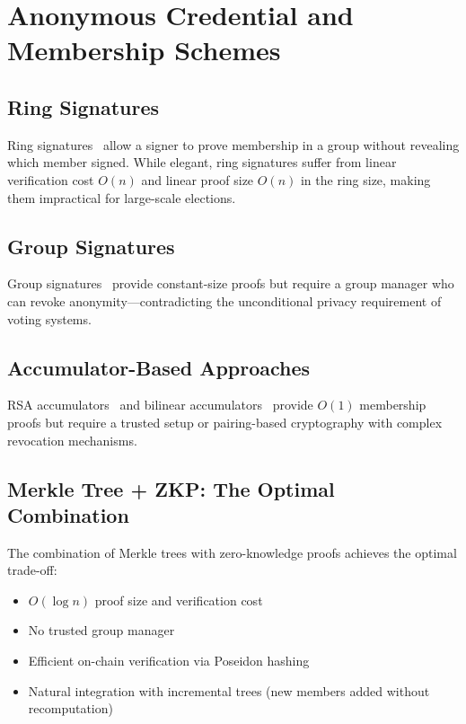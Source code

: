 \section{Anonymous Credential and Membership Schemes}

\subsection{Ring Signatures}

Ring signatures~\cite{rivest2001leak} allow a signer to prove membership in a group without revealing which member signed. While elegant, ring signatures suffer from linear verification cost $O(n)$ and linear proof size $O(n)$ in the ring size, making them impractical for large-scale elections.

\subsection{Group Signatures}

Group signatures~\cite{chaum1991group} provide constant-size proofs but require a group manager who can revoke anonymity---contradicting the unconditional privacy requirement of voting systems.

\subsection{Accumulator-Based Approaches}

RSA accumulators~\cite{benaloh1993one} and bilinear accumulators~\cite{nguyen2005accumulators} provide $O(1)$ membership proofs but require a trusted setup or pairing-based cryptography with complex revocation mechanisms.

\subsection{Merkle Tree + ZKP: The Optimal Combination}

The combination of Merkle trees with zero-knowledge proofs achieves the optimal trade-off:
\begin{itemize}
    \item $O(\log n)$ proof size and verification cost
    \item No trusted group manager
    \item Efficient on-chain verification via Poseidon hashing
    \item Natural integration with incremental trees (new members added without recomputation)
\end{itemize}


